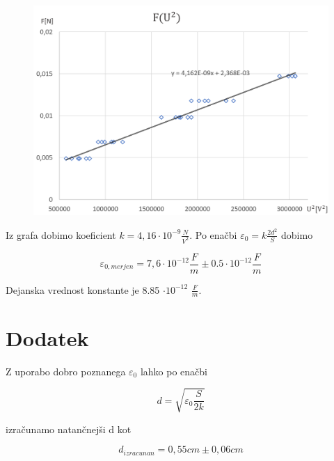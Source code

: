 \documentclass[a4paper]{report}
\begin{document}
\begin{figure}[htp]
    \centering
    \includegraphics[width=\textwidth]{energija in frekvenca graf.png}

\end{figure}

\noindent Iz grafa dobimo koeficient $k = 4,16 \cdot 10^{-9} \frac{N}{V^2}$. Po enačbi $\varepsilon_0 = k\frac{2d^{2}}{S}$  dobimo

 \[\varepsilon_{0, merjen} = 7,6 \cdot10^{-12} \frac{F}{m} \pm 0.5 \cdot 10^{-12} \frac{F}{m}\]

\noindent Dejanska vrednost konstante je 8.85 $\cdot 10^{-12}$ $\frac{F}{m}.$ 

\chapter*{Dodatek}
Z uporabo dobro poznanega $\varepsilon_0$ lahko po enačbi

\[d=\sqrt{\varepsilon_0\frac{S}{2k}}\]

\noindent izračunamo natančnejši d kot

\[ d_{izracunan} = 0,55cm \pm 0,06cm\]
 
\end{document}
